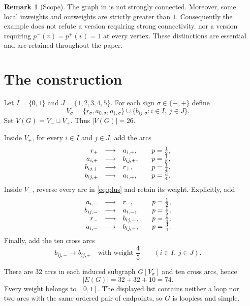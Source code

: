 \documentclass[10pt,reqno]{amsart}
\newcommand{\inwt}{p^{-}}
\newcommand{\outwt}{p^{+}}
\theoremstyle{definition}
\newtheorem{remark}[theorem]{Remark}
\begin{document}
\begin{remark}[Scope]\label{rem:scope}
The graph in  is not strongly connected. Moreover, some local inweights and outweights are strictly greater than $1$. Consequently the example does not refute a version requiring strong connectivity, nor a version requiring $\inwt(v)=\outwt(v)=1$ at every vertex. These distinctions are essential and are retained throughout the paper.
\end{remark}

\section{The construction}

Let $I=\{0,1\}$ and $J=\{1,2,3,4,5\}$. For each sign $\sigma\in\{-,+\}$ define
\[
  V_\sigma
  =\{r_\sigma,a_{0,\sigma},a_{1,\sigma}\}
   \cup\{b_{ij,\sigma}:i\in I,\ j\in J\}.
\]
Set $V(G)=V_-\sqcup V_+$. Thus $|V(G)|=26$.

Inside $V_+$, for every $i\in I$ and $j\in J$, add the arcs
\begin{equation}\label{eq:plus}
\begin{array}{rcl@{\qquad}c}
r_+&\longrightarrow&a_{i,+},&p=\frac12,\\
a_{i,+}&\longrightarrow&b_{ij,+},&p=\frac15,\\
b_{ij,+}&\longrightarrow&r_+,&p=\frac14,\\
b_{ij,+}&\longrightarrow&a_{i,+},&p=\frac34.
\end{array}
\end{equation}
Inside $V_-$, reverse every arc in \eqref{eq:plus} and retain its weight. Explicitly, add
\begin{equation}\label{eq:minus}
\begin{array}{rcl@{\qquad}c}
a_{i,-}&\longrightarrow&r_-,&p=\frac12,\\
b_{ij,-}&\longrightarrow&a_{i,-},&p=\frac15,\\
r_-&\longrightarrow&b_{ij,-},&p=\frac14,\\
a_{i,-}&\longrightarrow&b_{ij,-},&p=\frac34.
\end{array}
\end{equation}
Finally, add the ten cross arcs
\begin{equation}\label{eq:cross}
  b_{ij,-}\longrightarrow b_{ij,+}
  \quad\text{with weight }\frac45
  \qquad(i\in I,\ j\in J).
\end{equation}

There are $32$ arcs in each induced subgraph $G[V_\sigma]$ and ten cross arcs, hence
\[
  |E(G)|=32+32+10=74.
\]
Every weight belongs to $[0,1]$. The displayed list contains neither a loop nor two arcs with the same ordered pair of endpoints, so $G$ is loopless and simple.
\end{document}
